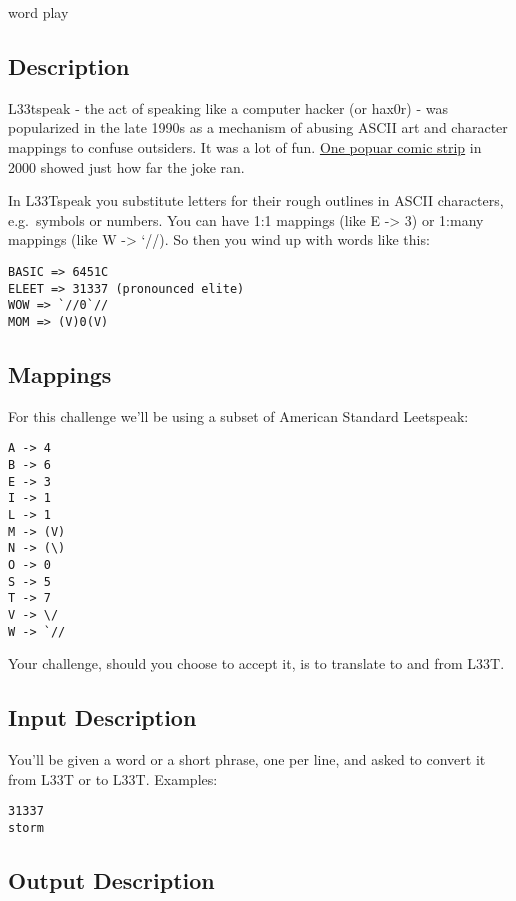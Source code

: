 word play

\subsection{Description}\label{description-30}

L33tspeak - the act of speaking like a computer hacker (or hax0r) - was
popularized in the late 1990s as a mechanism of abusing ASCII art and
character mappings to confuse outsiders. It was a lot of fun.
\href{http://megatokyo.com/strip/9}{One popuar comic strip} in 2000
showed just how far the joke ran.

In L33Tspeak you substitute letters for their rough outlines in ASCII
characters, e.g.~symbols or numbers. You can have 1:1 mappings (like E
-\textgreater{} 3) or 1:many mappings (like W -\textgreater{} `//). So
then you wind up with words like this:

\begin{verbatim}
BASIC => 6451C
ELEET => 31337 (pronounced elite)
WOW => `//0`//
MOM => (V)0(V)
\end{verbatim}

\subsection{Mappings}\label{mappings}

For this challenge we'll be using a subset of American Standard
Leetspeak:

\begin{verbatim}
A -> 4
B -> 6
E -> 3
I -> 1
L -> 1
M -> (V)
N -> (\)
O -> 0
S -> 5
T -> 7
V -> \/
W -> `//
\end{verbatim}

Your challenge, should you choose to accept it, is to translate to and
from L33T.

\subsection{Input Description}\label{input-description-22}

You'll be given a word or a short phrase, one per line, and asked to
convert it from L33T or to L33T. Examples:

\begin{verbatim}
31337 
storm 
\end{verbatim}

\subsection{Output Description}\label{output-description-23}

